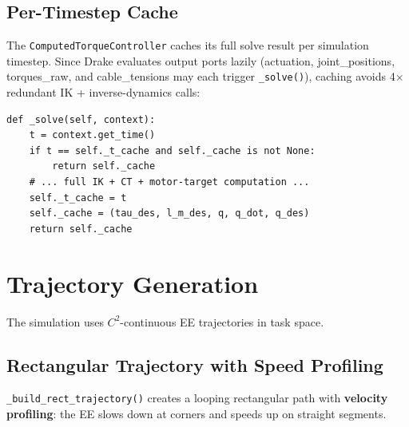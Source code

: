 \documentclass[11pt,a4paper]{article}
\begin{document}
\subsection{Per-Timestep Cache}

The \texttt{ComputedTorqueController} caches its full solve result per simulation timestep.  Since Drake evaluates output ports lazily (actuation, joint\_positions, torques\_raw, and cable\_tensions may each trigger \texttt{\_solve()}), caching avoids 4$\times$ redundant IK + inverse-dynamics calls:

\begin{lstlisting}[caption={Timestep-keyed cache avoids redundant solves.}]
def _solve(self, context):
    t = context.get_time()
    if t == self._t_cache and self._cache is not None:
        return self._cache
    # ... full IK + CT + motor-target computation ...
    self._t_cache = t
    self._cache = (tau_des, l_m_des, q, q_dot, q_des)
    return self._cache
\end{lstlisting}


\section{Trajectory Generation}
\label{sec:trajectory}

The simulation uses $C^2$-continuous EE trajectories in task space.

\subsection{Rectangular Trajectory with Speed Profiling}

\texttt{\_build\_rect\_trajectory()} creates a looping rectangular path with \textbf{velocity profiling}: the EE slows down at corners and speeds up on straight segments.
\end{document}
